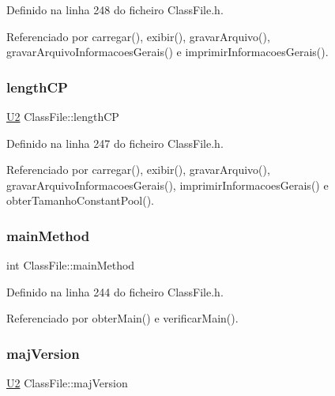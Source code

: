 Definido na linha 248 do ficheiro Class\+File.\+h.



Referenciado por carregar(), exibir(), gravar\+Arquivo(), gravar\+Arquivo\+Informacoes\+Gerais() e imprimir\+Informacoes\+Gerais().

\mbox{\label{classClassFile_acde5006251ffd25149efa4d6fb725cf5}} 
\subsubsection{\texorpdfstring{length\+CP}{lengthCP}}
{\footnotesize\ttfamily \hyperlink{BasicTypes_8h_a90240657108b1b457eef9d3f76e0202e}{U2} Class\+File\+::length\+CP\hspace{0.3cm}{\ttfamily [private]}}



Definido na linha 247 do ficheiro Class\+File.\+h.



Referenciado por carregar(), exibir(), gravar\+Arquivo(), gravar\+Arquivo\+Informacoes\+Gerais(), imprimir\+Informacoes\+Gerais() e obter\+Tamanho\+Constant\+Pool().

\mbox{\label{classClassFile_ac1cdef340faa0bd945b2236057433978}} 
\subsubsection{\texorpdfstring{main\+Method}{mainMethod}}
{\footnotesize\ttfamily int Class\+File\+::main\+Method\hspace{0.3cm}{\ttfamily [private]}}



Definido na linha 244 do ficheiro Class\+File.\+h.



Referenciado por obter\+Main() e verificar\+Main().

\mbox{\label{classClassFile_a40bd108a13debb86701cf31742572686}} 
\subsubsection{\texorpdfstring{maj\+Version}{majVersion}}
{\footnotesize\ttfamily \hyperlink{BasicTypes_8h_a90240657108b1b457eef9d3f76e0202e}{U2} Class\+File\+::maj\+Version\hspace{0.3cm}{\ttfamily [private]}}



